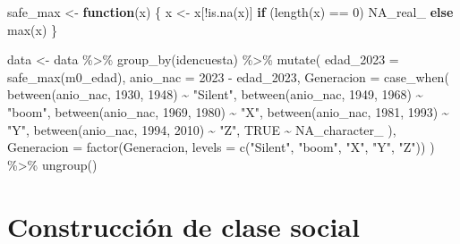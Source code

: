 \documentclass[
  spanish,
  a4paper,
  oneside]{scrbook}
\newenvironment{Shaded}{\begin{snugshade}}{\end{snugshade}}
\newcommand{\AttributeTok}[1]{\textcolor[rgb]{0.40,0.45,0.13}{#1}}
\newcommand{\ConstantTok}[1]{\textcolor[rgb]{0.56,0.35,0.01}{#1}}
\newcommand{\ControlFlowTok}[1]{\textcolor[rgb]{0.00,0.23,0.31}{\textbf{#1}}}
\newcommand{\DecValTok}[1]{\textcolor[rgb]{0.68,0.00,0.00}{#1}}
\newcommand{\FunctionTok}[1]{\textcolor[rgb]{0.28,0.35,0.67}{#1}}
\newcommand{\NormalTok}[1]{\textcolor[rgb]{0.00,0.23,0.31}{#1}}
\newcommand{\OtherTok}[1]{\textcolor[rgb]{0.00,0.23,0.31}{#1}}
\newcommand{\SpecialCharTok}[1]{\textcolor[rgb]{0.37,0.37,0.37}{#1}}
\newcommand{\StringTok}[1]{\textcolor[rgb]{0.13,0.47,0.30}{#1}}
\begin{document}
\begin{Shaded}
\begin{Highlighting}[]
\NormalTok{safe\_max }\OtherTok{\textless{}{-}} \ControlFlowTok{function}\NormalTok{(x) \{}
\NormalTok{  x }\OtherTok{\textless{}{-}}\NormalTok{ x[}\SpecialCharTok{!}\FunctionTok{is.na}\NormalTok{(x)]}
  \ControlFlowTok{if}\NormalTok{ (}\FunctionTok{length}\NormalTok{(x) }\SpecialCharTok{==} \DecValTok{0}\NormalTok{) }\ConstantTok{NA\_real\_} \ControlFlowTok{else} \FunctionTok{max}\NormalTok{(x)}
\NormalTok{\}}

\NormalTok{data }\OtherTok{\textless{}{-}}\NormalTok{ data }\SpecialCharTok{\%\textgreater{}\%}
  \FunctionTok{group\_by}\NormalTok{(idencuesta) }\SpecialCharTok{\%\textgreater{}\%}
  \FunctionTok{mutate}\NormalTok{(}
    \AttributeTok{edad\_2023 =} \FunctionTok{safe\_max}\NormalTok{(m0\_edad),}
    \AttributeTok{anio\_nac =} \DecValTok{2023} \SpecialCharTok{{-}}\NormalTok{ edad\_2023,}
    \AttributeTok{Generacion =} \FunctionTok{case\_when}\NormalTok{(}
      \FunctionTok{between}\NormalTok{(anio\_nac, }\DecValTok{1930}\NormalTok{, }\DecValTok{1948}\NormalTok{) }\SpecialCharTok{\textasciitilde{}} \StringTok{"Silent"}\NormalTok{,}
      \FunctionTok{between}\NormalTok{(anio\_nac, }\DecValTok{1949}\NormalTok{, }\DecValTok{1968}\NormalTok{) }\SpecialCharTok{\textasciitilde{}} \StringTok{"boom"}\NormalTok{,}
      \FunctionTok{between}\NormalTok{(anio\_nac, }\DecValTok{1969}\NormalTok{, }\DecValTok{1980}\NormalTok{) }\SpecialCharTok{\textasciitilde{}} \StringTok{"X"}\NormalTok{,}
      \FunctionTok{between}\NormalTok{(anio\_nac, }\DecValTok{1981}\NormalTok{, }\DecValTok{1993}\NormalTok{) }\SpecialCharTok{\textasciitilde{}} \StringTok{"Y"}\NormalTok{,}
      \FunctionTok{between}\NormalTok{(anio\_nac, }\DecValTok{1994}\NormalTok{, }\DecValTok{2010}\NormalTok{) }\SpecialCharTok{\textasciitilde{}} \StringTok{"Z"}\NormalTok{,}
      \ConstantTok{TRUE} \SpecialCharTok{\textasciitilde{}} \ConstantTok{NA\_character\_}
\NormalTok{    ),}
    \AttributeTok{Generacion =} \FunctionTok{factor}\NormalTok{(Generacion, }\AttributeTok{levels =} \FunctionTok{c}\NormalTok{(}\StringTok{"Silent"}\NormalTok{, }\StringTok{"boom"}\NormalTok{, }\StringTok{"X"}\NormalTok{, }\StringTok{"Y"}\NormalTok{, }\StringTok{"Z"}\NormalTok{))}
\NormalTok{  ) }\SpecialCharTok{\%\textgreater{}\%}
  \FunctionTok{ungroup}\NormalTok{()}
\end{Highlighting}
\end{Shaded}

\chapter{Construcción de clase
social}\label{construcciuxf3n-de-clase-social}
\end{document}
